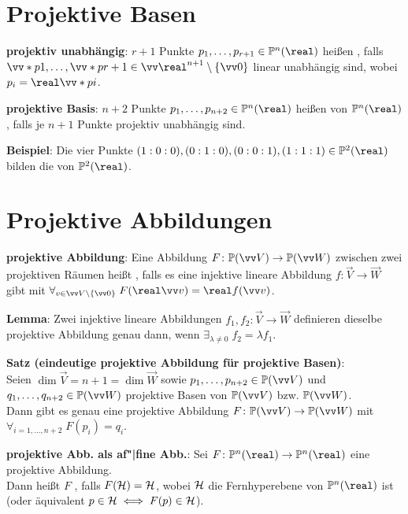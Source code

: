 \section{%
    Projektive Basen%
}

\textbf{projektiv unabhängig}:
$r+1$ Punkte $p_1, \dotsc, p_{r+1} \in \PP^n(\real)$ heißen , falls
$\vecs{p}{1}, \dotsc, \vecs{p}{r+1} \in \vec{\real}^{n+1} \setminus \{\vec{0}\}$ linear unabhängig
sind, wobei $p_i = \real\vecs{p}{i}$.

\textbf{projektive Basis}:
$n+2$ Punkte $p_1, \dotsc, p_{n+2} \in \PP^n(\real)$ heißen
von $\PP^n(\real)$, falls je $n+1$ Punkte projektiv unabhängig sind.

\textbf{Beispiel}:
Die vier Punkte $(1:0:0), (0:1:0), (0:0:1), (1:1:1) \in \PP^2(\real)$ bilden die
 von $\PP^2(\real)$.

\pagebreak

\section{%
    Projektive Abbildungen%
}

\textbf{projektive Abbildung}:
Eine Abbildung $F\colon \PP(\vec{V}) \to \PP(\vec{W})$ zwischen zwei projektiven Räumen heißt
, falls es eine injektive lineare Abbildung
$f\colon \vec{V} \to \vec{W}$ gibt mit
$\forall_{v \in \vec{V} \setminus \{\vec{0}\}}\; F(\real\vec{v}) = \real f(\vec{v})$.

\textbf{Lemma}:
Zwei injektive lineare Abbildungen $f_1, f_2\colon \vec{V} \to \vec{W}$ definieren dieselbe
projektive Abbildung genau dann, wenn $\exists_{\lambda\not=0}\; f_2 = \lambda f_1$.

\textbf{Satz (eindeutige projektive Abbildung für projektive Basen)}:\\
Seien $\dim \vec{V} = n + 1 = \dim \vec{W}$ sowie $p_1, \dotsc, p_{n+2} \in \PP(\vec{V})$ und
$q_1, \dotsc, q_{n+2} \in \PP(\vec{W})$ projektive Basen von $\PP(\vec{V})$ bzw. $\PP(\vec{W})$.\\
Dann gibt es genau eine projektive Abbildung $F\colon \PP(\vec{V}) \to \PP(\vec{W})$ mit
$\forall_{i = 1, \dotsc, n+2}\; F(p_i) = q_i$.

\linie

\textbf{projektive Abb. als af"|fine Abb.}:
Sei $F\colon \PP^n(\real) \to \PP^n(\real)$ eine projektive Abbildung.\\
Dann heißt $F$ , falls $F(\mathcal{H}) = \mathcal{H}$,
wobei $\mathcal{H}$ die Fernhyperebene von $\PP^n(\real)$ ist\\
(oder äquivalent $p \in \mathcal{H} \iff F(p) \in \mathcal{H}$).

